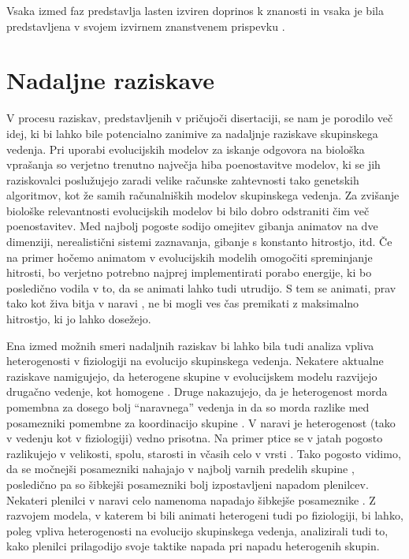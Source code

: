 \begin{razsirjeniPovzetek}
Vsaka izmed faz predstavlja lasten izviren doprinos k znanosti in vsaka je bila predstavljena v svojem izvirnem znanstvenem prispevku \cite{demsar2014simulated,demsar2015simulating,demsar2017evolution,demsar2016balanced}.

\section{Nadaljne raziskave}

V procesu raziskav, predstavljenih v pričujoči disertaciji, se nam je porodilo več idej, ki bi lahko bile potencialno zanimive za nadaljnje raziskave skupinskega vedenja. Pri uporabi evolucijskih modelov za iskanje odgovora na biološka vprašanja so verjetno trenutno največja hiba poenostavitve modelov, ki se jih raziskovalci poslužujejo zaradi velike računske zahtevnosti tako genetskih algoritmov, kot že samih računalniških modelov skupinskega vedenja. Za zvišanje biološke relevantnosti evolucijskih modelov bi bilo dobro odstraniti čim več poenostavitev. Med najbolj pogoste sodijo omejitev gibanja animatov na dve dimenziji, nerealistični sistemi zaznavanja, gibanje s konstanto hitrostjo, itd. Če na primer hočemo animatom v evolucijskih modelih omogočiti spreminjanje hitrosti, bo verjetno potrebno najprej implementirati porabo energije, ki bo posledično vodila v to, da se animati lahko tudi utrudijo. S tem se animati, prav tako kot živa bitja v naravi \cite{norin2016measurement,roche2013finding}, ne bi mogli ves čas premikati z maksimalno hitrostjo, ki jo lahko dosežejo. 

Ena izmed možnih smeri nadaljnih raziskav bi lahko bila tudi analiza vpliva heterogenosti v fiziologiji na evolucijo skupinskega vedenja. Nekatere aktualne raziskave namigujejo, da heterogene skupine v evolucijskem modelu razvijejo drugačno vedenje, kot homogene \cite{olson2015exploring}. Druge nakazujejo, da je heterogenost morda pomembna za dosego bolj ``naravnega'' vedenja \cite{demsar2013family} in da so morda razlike med posamezniki pomembne za koordinacijo skupine \cite{marras2012information,marras2013schooling}. V naravi je heterogenost (tako v vedenju kot v fiziologiji) vedno prisotna. Na primer ptice se v jatah pogosto razlikujejo v velikosti, spolu, starosti in včasih celo v vrsti \cite{lebarbajec2009organized,jolles2013heterogeneous}. Tako pogosto vidimo, da se močnejši posamezniki nahajajo v najbolj varnih predelih skupine \cite{hamilton1971geometry}, posledično pa so šibkejši posamezniki bolj izpostavljeni napadom plenilcev. Nekateri plenilci v naravi celo namenoma napadajo šibkejše posameznike \cite{domenici2014howsailfish,marras2015notsofast}. Z razvojem modela, v katerem bi bili animati heterogeni tudi po fiziologiji, bi lahko, poleg vpliva heterogenosti na evolucijo skupinskega vedenja, analizirali tudi to, kako plenilci prilagodijo svoje taktike napada pri napadu heterogenih skupin.


\end{razsirjeniPovzetek}
